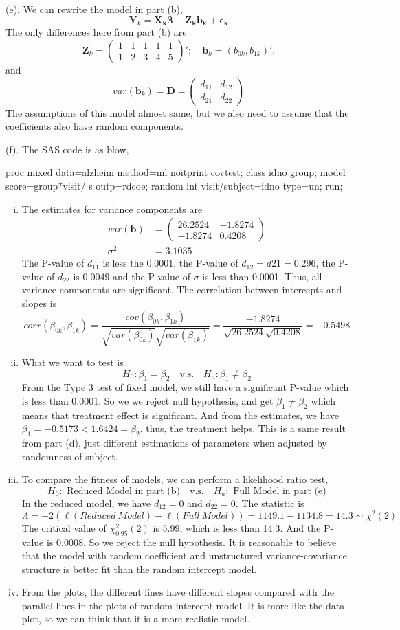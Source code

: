 \documentclass[letterpaper, 12pt]{article}
\newcommand{\ba}{$$\begin{aligned}}
\newcommand{\ea}{\end{aligned}$$}
\newcommand{\lma}{\left(\begin{matrix}}
\newcommand{\rma}{\end{matrix}\right)}
\begin{document}
(e). We can rewrite the model in part (b),
$$
\bm{Y}_k=\bm{X_k\beta+Z_kb_k+\epsilon_k}
$$
The only differences here from part (b) are
$$
\bm{Z}_k=\lma 1&1&1&1&1\\1&2&3&4&5\rma';\quad
\bm{b}_k=(b_{0k},b_{1k})'.
$$
and
$$
var(\bm{b}_k)=\bm{D}=\lma d_{11} &d_{12}\\d_{21}&d_{22}\rma
$$
The assumptions of this model almost same, but we also need to assume that the coefficients also have random components.


(f). The SAS code is as blow,
\begin{Sascode}[store=class]
proc mixed data=alzheim method=ml noitprint covtest;
class idno group;
model score=group*visit/ s outp=rdcoe;
random int visit/subject=idno type=un;
run;
\end{Sascode}

\begin{enumerate}[i.]
\item The estimates for variance components are
\ba
var(\bm{b})&=\lma 26.2524&-1.8274\\-1.8274&0.4208\rma\\
\sigma^2&=3.1035
\ea
The P-value of $d_{11}$ is less the 0.0001, the P-value of $d_{12}=d{21}=0.296$, the P-value of $d_{22}$ is 0.0049 and the P-value of $\sigma$ is less than 0.0001. Thus, all variance components are significant. The correlation between intercepts and slopes is
$$
corr(\beta_{0k},\beta_{1k})=\frac{cov(\beta_{0k},\beta_{1k})}{\sqrt{var(\beta_{0k})}\sqrt{var(\beta_{1k})}}=\frac{-1.8274}{\sqrt{26.2524}\sqrt{0.4208}}=-0.5498
$$

\item What we want to test is
$$
H_0:\beta_1=\beta_2\quad\text{v.s.}\quad H_a: \beta_1\not=\beta_2
$$
From the Type 3 test of fixed model, we still have a significant P-value which is less than 0.0001. So we we reject null hypothesis, and get $\beta_1\not=\beta_2$ which means that treatment effect is significant. And from the estimates, we have $\beta_1=-0.5173<1.6424=\beta_2$, thus, the treatment helps. This is a same result from part (d), just different estimations of parameters when adjusted by randomness of subject.

\item To compare the fitness of models, we can perform a likelihood ratio test,
$$
H_0:\text{ Reduced Model in part (b)}\quad\text{v.s.}\quad H_a:\text{ Full Model in part (e)}
$$
In the reduced model, we have $d_{12}=0$ and $d_{22}=0$.
The statistic is 
$$
\Lambda=-2(\ell(Reduced~Model)-\ell(Full~Model))=1149.1-1134.8=14.3\sim\chi^2(2)
$$
The critical value of $\chi^2_{0.95}(2)$ is 5.99, which is less than 14.3. And the P-value is 0.0008. So we reject the null hypothesis. It is reasonable to believe that the model with random coefficient and unstructured variance-covariance structure is better fit than the random intercept model.
\item From the plots, the different lines have different slopes compared with the parallel lines in the plots of random intercept model. It is more like the data plot, so we can think that it is a more realistic model.
\end{enumerate}
\end{document}
